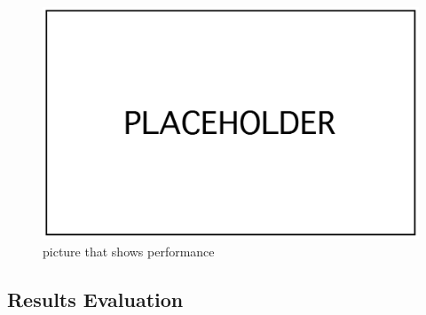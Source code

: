 \begin{figure}[!htb]
  \centering
  \includegraphics[width=\textwidth,height=\textheight,keepaspectratio]{img/placeholder.png}
  \caption[caption]{ picture that shows performance }
  \label{fig:variable-performance}
\end{figure}

\subsection{Results Evaluation}\label{sec:results-evaluation}